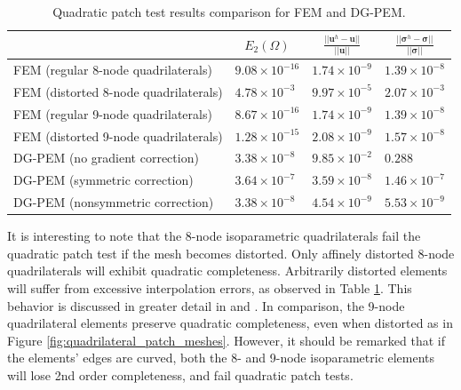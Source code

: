 \begin{table}[!ht]
  \begin{center}
    \begin{tabular}{| l || l | l | l |}
    \hline
           & \multicolumn{1}{|c|}{$E_2 (\Omega)$} & \multicolumn{1}{|c|}{$\frac{||\bm{u}^h - \bm{u}||}{||\bm{u}||}$} & \multicolumn{1}{|c|}{$\frac{||\boldsymbol{\sigma}^h - \boldsymbol{\sigma}||}{||\boldsymbol{\sigma}||}$} \\ \hline \hline
    FEM (regular 8-node quadrilaterals) & $9.08 \times 10^{-16}$ & $1.74 \times 10^{-9}$ & $1.39 \times 10^{-8}$ \\ \hline
    FEM (distorted 8-node quadrilaterals) & $4.78 \times 10^{-3}$ & $9.97 \times 10^{-5}$ & $2.07 \times 10^{-3}$ \\ \hline
    FEM (regular 9-node quadrilaterals) & $8.67 \times 10^{-16}$ & $1.74 \times 10^{-9}$ & $1.39 \times 10^{-8}$ \\ \hline
    FEM (distorted 9-node quadrilaterals) & $1.28 \times 10^{-15}$ & $2.08 \times 10^{-9}$ & $1.57 \times 10^{-8}$ \\ \hline
    DG-PEM (no gradient correction) & $3.38 \times 10^{-8}$ & $9.85 \times 10^{-2}$ & $0.288$ \\ \hline
    DG-PEM (symmetric correction) & $3.64 \times 10^{-7}$ & $3.59 \times 10^{-8}$ & $1.46 \times 10^{-7}$ \\ \hline
    DG-PEM (nonsymmetric correction) & $3.38 \times 10^{-8}$ & $4.54 \times 10^{-9}$ & $5.53 \times 10^{-9}$ \\
    \hline
    \end{tabular}
    \caption{Quadratic patch test results comparison for FEM and DG-PEM.}
    \vspace{-5pt}
    \label{tab:quadratic_patch_test}
    \vspace{-10pt}
  \end{center}
\end{table}

It is interesting to note that the 8-node isoparametric quadrilaterals fail the quadratic patch test if the mesh becomes distorted. Only affinely distorted 8-node quadrilaterals will exhibit quadratic completeness. Arbitrarily distorted elements will suffer from excessive interpolation errors, as observed in Table \ref{tab:quadratic_patch_test}. This behavior is discussed in greater detail in \cite{Arnold:02} and \cite{Arnold:01}. In comparison, the 9-node quadrilateral elements preserve quadratic completeness, even when distorted as in Figure \ref{fig:quadrilateral_patch_meshes}. However, it should be remarked that if the elements' edges are curved, both the 8- and 9-node isoparametric elements will lose 2nd order completeness, and fail quadratic patch tests.

